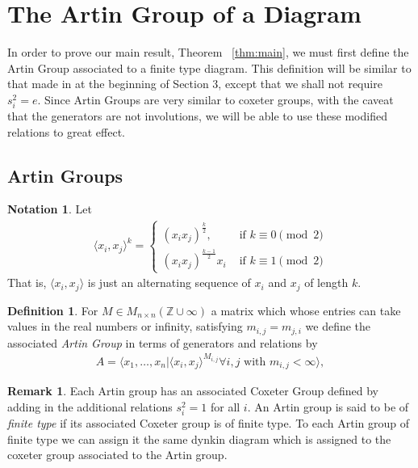 \documentclass[11pt]{amsart}
\theoremstyle{definition}
\newtheorem{defn}[thm]{Definition}
\newtheorem{note}[thm]{Notation}
\newtheorem{rem}[thm]{Remark}
\begin{document}
\section{The Artin Group of a Diagram}
\label{sec:defn_artingroup}

In order to prove our main result, Theorem ~\ref{thm:main}, we must first define the Artin Group associated to a finite type diagram. This definition will be similar to that made in \cite{BM13} at the beginning of Section 3, except that we shall not require $s_i^2 = e.$ Since Artin Groups are very similar to coxeter groups, with the caveat that the generators are not involutions, we will be able to use these modified relations to great effect.

\subsection{Artin Groups}

\begin{note}
Let 
\begin{align*}
	\langle x_i,x_j \rangle ^k = \begin{cases}
	(x_ix_j)^{\frac{k}{2}}, &\text{ if }k \equiv 0 \pmod 2\\
	(x_ix_j)^{\frac{k-1}{2}}x_i &\text{ if } k \equiv 1 \pmod 2
\end{cases}
\end{align*}
That is, $\langle x_i,x_j \rangle$ is just an alternating sequence of $x_i$ and $x_j$ of length $k.$

\end{note}
\begin{defn}
For $M \in M_{n \times n}(\mathbb Z \cup \infty)$ a matrix which whose entries can take values in the real numbers or infinity, satisfying $m_{i,j} = m_{j,i}$ we define the associated {\it Artin Group} in terms of generators and relations by
\begin{align*}
	A = \langle x_1,\ldots, x_n| \langle x_i,x_j \rangle^{M_{i,j}}\forall i,j \text{ with } m_{i,j}<\infty \rangle,
\end{align*}
\end{defn}

\begin{rem}
Each Artin group has an associated Coxeter Group defined by adding in the additional relations $s_i^2 = 1$ for all $i.$ An Artin group is said to be of {\it finite type} if its associated Coxeter group is of finite type. To each Artin group of finite type we can assign it the same dynkin diagram which is assigned to the coxeter group associated to the Artin group.
\end{rem}
\end{document}
